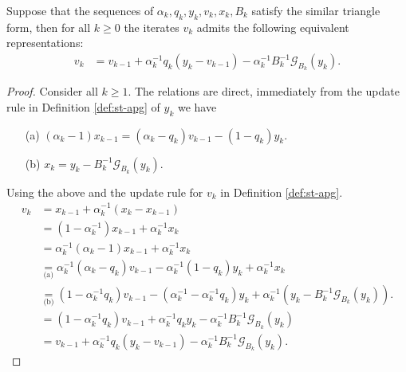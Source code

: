 \documentclass[12pt]{article}
\begin{document}
    \begin{lemma}\label{lemma:st-iterates-alt-form-part1}
        Suppose that the sequences of $\alpha_k, q_k, y_k, v_k, x_k, B_k$ satisfy the similar triangle form, then for all $k \ge 0$ the iterates $v_k$ admits the following equivalent representations: 
        \begin{align*}
            v_k
            &= v_{k - 1} + \alpha_k^{-1}q_k(y_k - v_{k - 1}) - \alpha_{k}^{-1}B_k^{-1}\mathcal G_{B_k}(y_k). 
        \end{align*}
    \end{lemma}
    \begin{proof}
        Consider all $k \ge 1$. 
        The relations are direct, immediately from the update rule in Definition \ref{def:st-apg} of $y_k$ we have
        \begin{enumerate}[nosep]
            \item[(a)] $(\alpha_k - 1)x_{k - 1} = (\alpha_k - q_k)v_{k - 1} - (1 - q_k)y_k$. 
            \item[(b)] $x_k = y_k - B_k^{-1}\mathcal G_{B_k}(y_k)$. 
        \end{enumerate}
        Using the above and the update rule for $v_k$ in Definition \ref{def:st-apg}. 
        \begin{align*}
            v_k &= x_{k - 1} + \alpha_k^{-1}(x_k - x_{k - 1})
            \\
            &= (1 - \alpha_k^{-1})x_{k - 1} + \alpha_k^{-1}x_k
            \\
            &= \alpha_k^{-1}(\alpha_k - 1)x_{k - 1} + \alpha_k^{-1}x_k
            \\
            &\underset{\text{(a)}}{=} \alpha_k^{-1}(\alpha_k - q_k)v_{k - 1} - \alpha_{k}^{-1}(1 - q_k)y_k 
            + \alpha_k^{-1}x_k
            \\
            &\underset{\text{(b)}}{=} (1 - \alpha_k^{-1}q_k) v_{k - 1} - (\alpha_k^{-1} - \alpha_k^{-1}q_k)y_k
            + \alpha_k^{-1}(y_k - B_k^{-1}\mathcal G_{B_k}(y_k)). 
            \\
            &= 
            (1 - \alpha_k^{-1}q_k) v_{k - 1} + \alpha_k^{-1}q_ky_k
            - \alpha_k^{-1}B_k^{-1}\mathcal G_{B_k}(y_k)
            \\
            &= v_{k - 1} + \alpha_k^{-1}q_k(y_k - v_{k - 1}) - \alpha_{k}^{-1}B_k^{-1}\mathcal G_{B_k}(y_k). 
        \end{align*}
    \end{proof}
\end{document}
